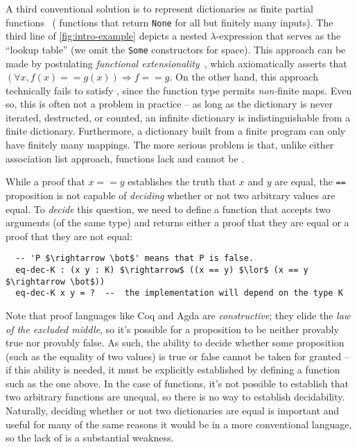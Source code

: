 A third conventional solution is to represent dictionaries as finite partial functions~\cite[Maps]{Pierce:SF1} (\ie{} functions that return \texttt{None} for all but finitely many inputs).
%
The third line of \autoref{fig:intro-example} depicts a nested $\lambda$-expression that serves as the ``lookup table'' (we omit the \texttt{Some} constructors for space).
%
This approach can be made \extensional{} by postulating \emph{functional extensionality}~\mbox{\cite[Logic]{Pierce:SF1}}, which axiomatically asserts that $(\forall x, f(x) == g(x)) \Rightarrow f == g$.
%
On the other hand, this approach technically fails to satisfy \SemTot, since the function type permits \emph{non-}finite maps.
%
Even so, this is often not a problem in practice -- as long as the dictionary is never iterated, destructed, or counted, an infinite dictionary is indistinguishable from a finite dictionary.
%
Furthermore, a dictionary built from a finite program can only have finitely many mappings.
%
The more serious problem is that, unlike either association list approach, functions lack \firstUseGoal{\DecidableEq} and cannot be \firstUseGoal{\destructed}.

While a proof that $x == y$ establishes the truth that $x$ and $y$ are equal, the \texttt{==} proposition is not capable of \emph{deciding} whether or not two arbitrary values are equal.
%
To \emph{decide} this question, we need to define a function that accepts two arguments (of the same type) and returns either a proof that they are equal or a proof that they are not equal:
\begin{lstlisting}
  -- 'P $\rightarrow \bot$' means that P is false.
  eq-dec-K : (x y : K) $\rightarrow$ ((x == y) $\lor$ (x == y $\rightarrow \bot$))
  eq-dec-K x y = ?  --  the implementation will depend on the type K
\end{lstlisting}

Note that proof languages like Coq and Agda are \emph{constructive}; they elide the \emph{law of the excluded middle}, so it's possible for a proposition to be neither provably true nor provably false.
%
As such, the ability to decide whether some proposition (such as the equality of two values) is true or false cannot be taken for granted -- if this ability is needed, it must be explicitly established by defining a function such as the one above.
%
In the case of functions, it's not possible to establish that two arbitrary functions are unequal, so there is no way to establish decidability.
%
Naturally, deciding whether or not two dictionaries are equal is important and useful for many of the same reasons it would be in a more conventional language, so the lack of \DecidableEq{} is a substantial weakness.

